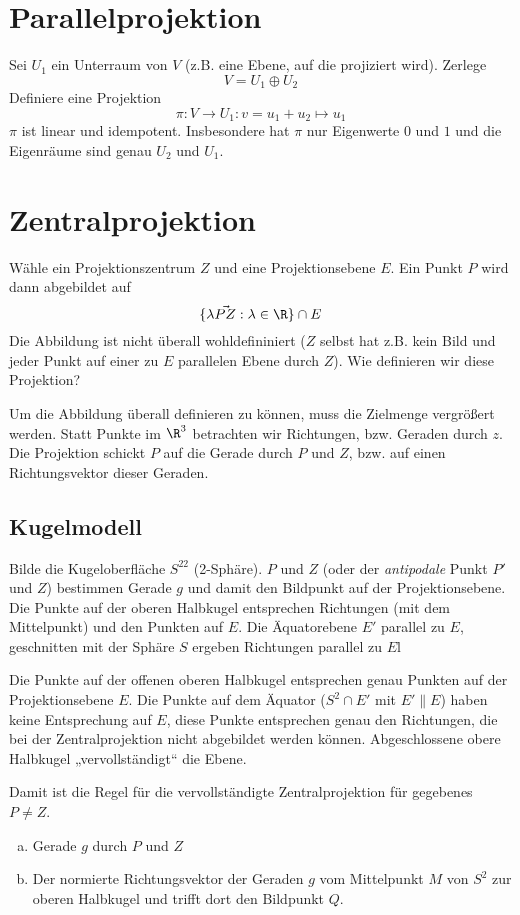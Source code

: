 \documentclass[a4paper, 10pt]{scrbook}
\begin{document}
\section{Parallelprojektion}


Sei $U_1$ ein Unterraum von $V$ (z.B. eine Ebene, auf die projiziert wird).
Zerlege
\[
	V = U_1 \oplus U_2
\]
Definiere eine Projektion
\[
	\pi : V \to U_1 : v = u_1 + u_2 \mapsto u_1
\]
$\pi$ ist linear und idempotent.
Insbesondere hat $\pi$ nur Eigenwerte $0$ und $1$ und die Eigenräume sind genau $U_2$ und $U_1$.


\section{Zentralprojektion}


Wähle ein Projektionszentrum $Z$ und eine Projektionsebene $E$.
Ein Punkt $P$ wird dann abgebildet auf
\[
	\{\lambda \vec{PZ} : \lambda\in \R\} \cap E
\]
Die Abbildung ist nicht überall wohldefininiert ($Z$ selbst hat z.B. kein Bild und jeder Punkt auf einer zu $E$ parallelen Ebene durch $Z$).
Wie definieren wir diese Projektion?

Um die Abbildung überall definieren zu können, muss die Zielmenge vergrößert werden.
Statt Punkte im $\R^3$ betrachten wir Richtungen, bzw. Geraden durch $z$.
Die Projektion schickt $P$ auf die Gerade durch $P$ und $Z$, bzw. auf einen Richtungsvektor dieser Geraden.


\subsection{Kugelmodell}


Bilde die Kugeloberfläche $S^22$ (2-Sphäre).
$P$ und $Z$ (oder der \emph{antipodale} Punkt $P'$ und $Z$) bestimmen Gerade $g$ und damit den Bildpunkt auf der Projektionsebene.
Die Punkte auf der oberen Halbkugel entsprechen Richtungen (mit dem Mittelpunkt) und den Punkten auf $E$.
Die Äquatorebene $E'$ parallel zu $E$, geschnitten mit der Sphäre $S$ ergeben Richtungen parallel zu $E$l

Die Punkte auf der offenen oberen Halbkugel entsprechen genau Punkten auf der Projektionsebene $E$.
Die Punkte auf dem Äquator ($S^2\cap E'$ mit $E'\|E$) haben keine Entsprechung auf $E$, diese Punkte entsprechen genau den Richtungen, die bei der Zentralprojektion nicht abgebildet werden können.
Abgeschlossene obere Halbkugel „vervollständigt“ die Ebene.

Damit ist die Regel für die vervollständigte Zentralprojektion für gegebenes $P\neq Z$.
\begin{enumerate}[a.]
	\item
		Gerade $g$ durch $P$ und $Z$
	\item
		Der normierte Richtungsvektor der Geraden $g$ vom Mittelpunkt $M$ von $S^2$ zur oberen Halbkugel und trifft dort den Bildpunkt $Q$.
\end{enumerate}
\end{document}
